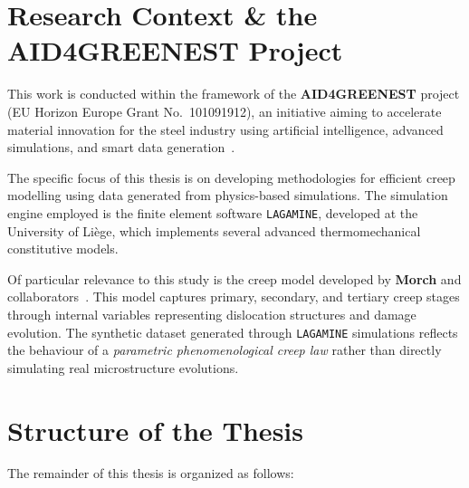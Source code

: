 \documentclass[class=scrbook, crop=false]{standalone}
\begin{document}
\section{Research Context \& the AID4GREENEST Project}
\label{Section::Research_Context_&_AID4GREENEST_Project}

This work is conducted within the framework of the \textbf{AID4GREENEST} project (EU Horizon Europe Grant No.~101091912), an initiative aiming to accelerate material innovation for the steel industry using artificial intelligence, advanced simulations, and smart data generation~\cite{aid4greenest}.

The specific focus of this thesis is on developing methodologies for efficient creep modelling using data generated from physics-based simulations. The simulation engine employed is the finite element software \texttt{LAGAMINE}, developed at the University of Liège, which implements several advanced thermomechanical constitutive models.

Of particular relevance to this study is the creep model developed by \textbf{Morch} and collaborators~\cite{morch2022creep}. This model captures primary, secondary, and tertiary creep stages through internal variables representing dislocation structures and damage evolution. The synthetic dataset generated through \texttt{LAGAMINE} simulations reflects the behaviour of a \textit{parametric phenomenological creep law} rather than directly simulating real microstructure evolutions. 

\section{Structure of the Thesis}
\label{Section::Structure_of_the_Thesis}

The remainder of this thesis is organized as follows:
\end{document}

